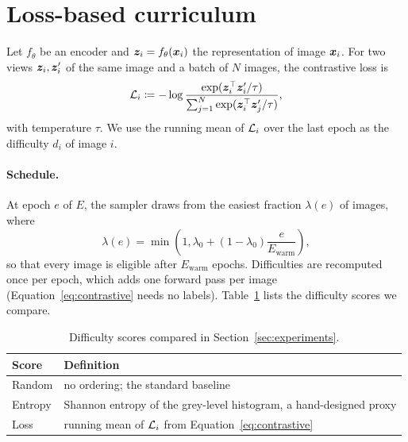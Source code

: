 \section{Loss-based curriculum}
\label{sec:method}

Let $f_\theta$ be an encoder and $\bm{z}_i = f_\theta(\bm{x}_i)$ the representation of image $\bm{x}_i$.
For two views $\bm{z}_i, \bm{z}_i'$ of the same image and a batch of $N$ images, the contrastive loss is
\begin{equation}
  \mathcal{L}_i \coloneqq -\log \frac{\exp(\bm{z}_i^\top \bm{z}_i' / \tau)}{\sum_{j=1}^{N} \exp(\bm{z}_i^\top \bm{z}_j' / \tau)},
  \label{eq:contrastive}
\end{equation}
with temperature $\tau$.
We use the running mean of $\mathcal{L}_i$ over the last epoch as the difficulty $d_i$ of image $i$.

\paragraph{Schedule.}
At epoch $e$ of $E$, the sampler draws from the easiest fraction $\lambda(e)$ of images, where
\begin{equation}
  \lambda(e) = \min\!\left(1, \lambda_0 + (1 - \lambda_0)\frac{e}{E_\mathrm{warm}}\right),
  \label{eq:pacing}
\end{equation}
so that every image is eligible after $E_\mathrm{warm}$ epochs.
Difficulties are recomputed once per epoch, which adds one forward pass per image (Equation~\ref{eq:contrastive} needs no labels).
Table~\ref{tab:scores} lists the difficulty scores we compare.

\begin{table}[t]
  \centering
  \caption{Difficulty scores compared in Section~\ref{sec:experiments}.}
  \label{tab:scores}
  \begin{tabularx}{\linewidth}{@{}lX@{}}
    \toprule
    Score & Definition \\
    \midrule
    Random & no ordering; the standard baseline \\
    Entropy & Shannon entropy of the grey-level histogram, a hand-designed proxy \\
    Loss & running mean of $\mathcal{L}_i$ from Equation~\ref{eq:contrastive} \\
    \bottomrule
  \end{tabularx}
\end{table}
